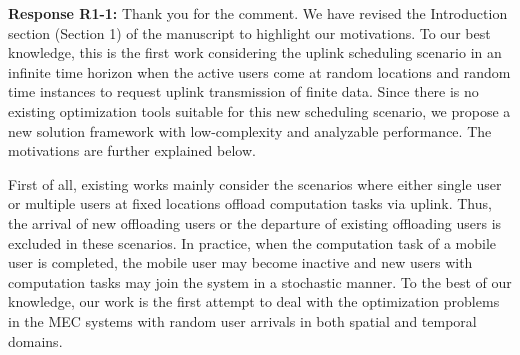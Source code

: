 \documentclass[12pt,onecolumn]{IEEEtran}
\newcommand{\blue}{\color{blue}}
\begin{document}
{\blue \textbf{Response R1-1:} Thank you for the comment. We have revised the Introduction section (Section 1) of the manuscript to highlight our motivations. To our best knowledge, this is  the first work considering the uplink scheduling scenario in an infinite time horizon when the active users come at random locations and random time instances to request uplink transmission of finite data. Since there is no existing optimization tools suitable for this new scheduling scenario, we propose a new solution framework with low-complexity and analyzable performance. The motivations are further explained below.

First of all, existing works mainly consider the scenarios where either single user \cite{You2015SingleUserWPT,you2016singleuser,huang2012dynamic,liu2016delayopt} or multiple users \cite{you2016multiuser,chen2015decentalizedgame,chen2016gametheorymec,mao2016power-delay,Ko2018HetnetMEC} at fixed locations offload computation tasks via uplink. Thus, the arrival of new offloading users or the departure of existing offloading users is excluded in these scenarios. In practice, when the computation task of a mobile user is completed, the mobile user may become inactive and new users with computation tasks may join the system in a stochastic manner. To the best of our knowledge, our work is the first attempt to deal with the optimization problems in the MEC systems with random user arrivals in both spatial and temporal domains.

}
\end{document}

